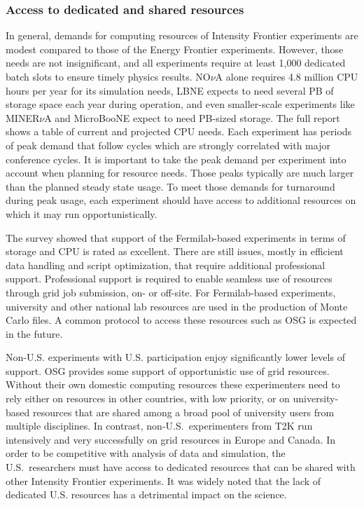 \subsubsection{Access to dedicated and shared resources}
In general, demands for computing resources of Intensity Frontier experiments are modest compared to those of the Energy Frontier
experiments.  However, those needs are not insignificant, and all experiments
require at least 1,000 dedicated batch slots to ensure timely physics results. 
NO$\nu$A alone requires 4.8 million
CPU hours per year for its simulation needs, LBNE expects to need
several PB of storage space each year during operation, and even smaller-scale
experiments like MINER$\nu$A and MicroBooNE expect to need PB-sized storage.
The full report shows a table of current and projected CPU needs. Each
experiment has periods of peak demand that follow cycles which are strongly correlated with
major conference cycles.  It is important to take the peak demand per
experiment into account when planning for resource needs. Those peaks
typically are much larger than the planned steady state usage. To meet those
demands for turnaround during peak usage, each experiment should have access to
additional resources on which it may run opportunistically.

The survey showed that support of the Fermilab-based experiments in terms of
storage and CPU is rated as excellent.  There are still issues, mostly in efficient data 
handling and script optimization, that require additional professional support. Professional support is required to
enable seamless use of resources through grid job submission, on- or off-site.
For Fermilab-based experiments, university and other national lab resources
are used in the production of Monte Carlo files. A common protocol to access
these resources such as OSG is expected in the future.

Non-U.S. experiments with U.S. participation enjoy significantly
lower levels of support. OSG provides some support of opportunistic use of
grid resources.  Without their own domestic computing resources these
experimenters need to rely either on resources in other countries, with low
priority, or on university-based resources that are shared among a broad
pool of university users from multiple disciplines. In contrast, non-U.S.\ experimenters
from T2K run intensively and very successfully on grid resources in Europe and
Canada.  In order to be competitive with analysis of data and simulation, the U.S.\ researchers must have access to dedicated resources that can
be shared with other Intensity Frontier experiments. It was widely noted that the lack of dedicated U.S.
resources has a detrimental impact on the science.

